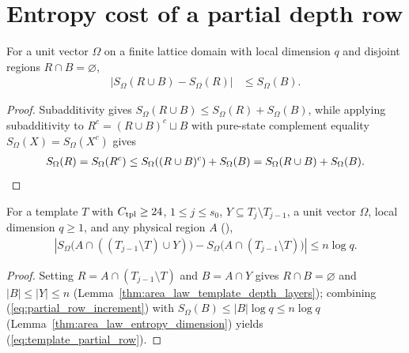 \section{Entropy cost of a partial depth row}

\begin{lemma}
    \label{thm:area_partial_row_increment}
    \leanok
    For a unit vector $\Omega$ on a finite lattice domain with local dimension $q$ and disjoint regions $R\cap B=\varnothing$,
    \begin{align}
        |S_\Omega(R\cup B)-S_\Omega(R)| & \le S_\Omega(B). \label{eq:partial_row_increment}
    \end{align}
\end{lemma}
\begin{proof}\leanok
    Subadditivity gives $S_\Omega(R\cup B)\le S_\Omega(R)+S_\Omega(B)$, while applying subadditivity to $R^c=(R\cup B)^c\sqcup B$ with pure-state complement equality $S_\Omega(X)=S_\Omega(X^c)$ gives
    \begin{align}
        S_\Omega(R) =S_\Omega(R^c)
        \le S_\Omega((R\cup B)^c)+S_\Omega(B)
        =S_\Omega(R\cup B)+S_\Omega(B). \notag
    \end{align}
\end{proof}

\begin{lemma}
    \label{thm:area_template_partial_row}
    \leanok
    For a template $T$ with $C_{\rm tpl}\ge24$, $1\le j\le s_0$, $Y\subseteq T_j\setminus T_{j-1}$, a unit vector $\Omega$, local dimension $q\ge1$, and any physical region $A$ (\cite[Lemma~9.4]{OpenAI2026AreaLaw}),
    \begin{align}
        \left|S_\Omega\bigl(A\cap((T_{j-1}\setminus T)\cup Y)\bigr)
        -S_\Omega\bigl(A\cap(T_{j-1}\setminus T)\bigr)\right|
        \le n\log q. \label{eq:template_partial_row}
    \end{align}
\end{lemma}
\begin{proof}\leanok
    Setting $R=A\cap(T_{j-1}\setminus T)$ and $B=A\cap Y$ gives $R\cap B=\varnothing$ and $|B|\le|Y|\le n$ (Lemma~\ref{thm:area_law_template_depth_layers}); combining (\ref{eq:partial_row_increment}) with $S_\Omega(B)\le|B|\log q\le n\log q$ (Lemma~\ref{thm:area_law_entropy_dimension}) yields (\ref{eq:template_partial_row}).
\end{proof}

